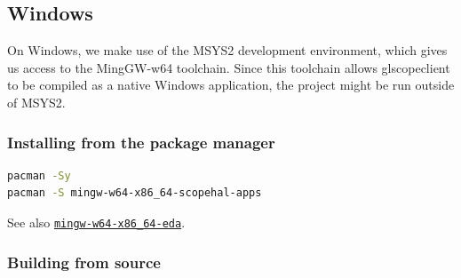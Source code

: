 \subsection{Windows}

On Windows, we make use of the MSYS2 development environment, which gives us access to the MingGW-w64 toolchain.
Since this toolchain allows glscopeclient to be compiled as a native Windows application, the project might be run
outside of MSYS2.

\subsubsection{Installing from the package manager}

\begin{lstlisting}[language=sh, numbers=none]
pacman -Sy
pacman -S mingw-w64-x86_64-scopehal-apps
\end{lstlisting}

See also \href{https://packages.msys2.org/group/mingw-w64-x86_64-eda}{\lstinline{mingw-w64-x86_64-eda}}.

\subsubsection{Building from source}

